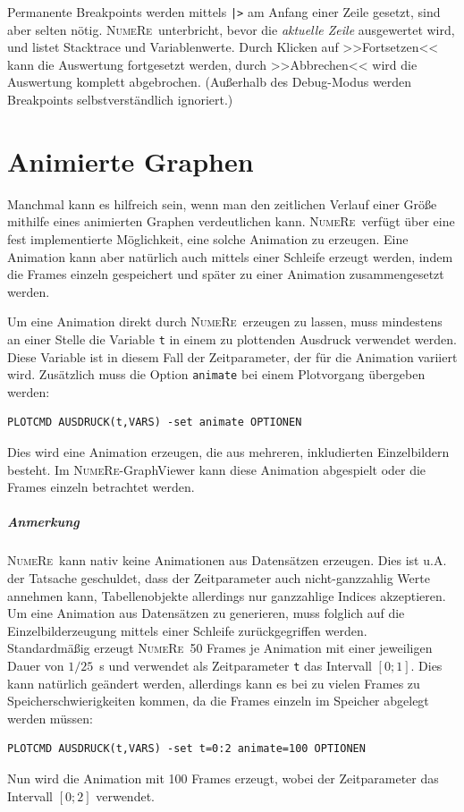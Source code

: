 \documentclass[DIV=14,headsepline,footsepline]{scrbook}
\newcommand{\NR}{\textsc{Nu\-me\-Re}}
\begin{document}
				Permanente Breakpoints werden mittels \verb+|>+ am Anfang einer Zeile gesetzt, sind aber selten nötig. \NR\ unterbricht, bevor die \emph{aktuelle Zeile} ausgewertet wird, und listet Stacktrace und Variablenwerte. Durch Klicken auf >>Fortsetzen<< kann die Auswertung fortgesetzt werden, durch >>Abbrechen<< wird die Auswertung komplett abgebrochen. (Außerhalb des Debug-Modus werden Breakpoints selbstverständlich ignoriert.)
				
		\chapter{Animierte Graphen}
			Manchmal kann es hilfreich sein, wenn man den zeitlichen Verlauf einer Größe mithilfe eines animierten Graphen verdeutlichen kann. \NR\ verfügt über eine fest implementierte Möglichkeit, eine solche Animation zu erzeugen. Eine Animation kann aber natürlich auch mittels einer Schleife erzeugt werden, indem die Frames einzeln gespeichert und später zu einer Animation zusammengesetzt werden.
			
			Um eine Animation direkt durch \NR\ erzeugen zu lassen, muss mindestens an einer Stelle die Variable \verb+t+ in einem zu plottenden Ausdruck verwendet werden. Diese Variable ist in diesem Fall der Zeitparameter, der für die Animation variiert wird. Zusätzlich muss die Option \verb+animate+ bei einem Plotvorgang übergeben werden:
			\begin{lstlisting}
PLOTCMD AUSDRUCK(t,VARS) -set animate OPTIONEN
			\end{lstlisting}
			Dies wird eine Animation erzeugen, die aus mehreren, inkludierten Einzelbildern besteht. Im \NR-GraphViewer kann diese Animation abgespielt oder die Frames einzeln betrachtet werden.
			
			\paragraph{Anmerkung}
				\NR\ kann nativ keine Animationen aus Datensätzen erzeugen. Dies ist u.A. der Tatsache geschuldet, dass der Zeitparameter auch nicht-ganzzahlig Werte annehmen kann, Tabellenobjekte allerdings nur ganzzahlige Indices akzeptieren. Um eine Animation aus Datensätzen zu generieren, muss folglich auf die Einzelbilderzeugung mittels einer Schleife zurückgegriffen werden.\bigskip\\
			Standardmäßig erzeugt \NR\ 50 Frames je Animation mit einer jeweiligen Dauer von $1/25$~s und verwendet als Zeitparameter \verb+t+ das Intervall $[0;1]$. Dies kann natürlich geändert werden, allerdings kann es bei zu vielen Frames zu Speicherschwierigkeiten kommen, da die Frames einzeln im Speicher abgelegt werden müssen:
			\begin{lstlisting}
PLOTCMD AUSDRUCK(t,VARS) -set t=0:2 animate=100 OPTIONEN
			\end{lstlisting}
			Nun wird die Animation mit 100 Frames erzeugt, wobei der Zeitparameter das Intervall $[0;2]$ verwendet.
\end{document}
